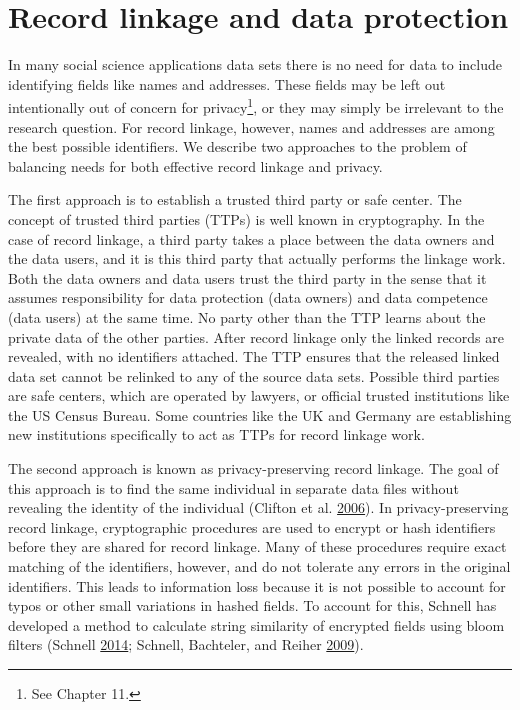 \documentclass[]{krantz}
\begin{document}
\section{Record linkage and data
protection}\label{record-linkage-and-data-protection}

In many social science applications data sets there is no need for data
to include identifying fields like names and addresses. These fields may
be left out intentionally out of concern for privacy\footnote{See
  Chapter 11.}, or they may simply be irrelevant to the research
question. For record linkage, however, names and addresses are among the
best possible identifiers. We describe two approaches to the problem of
balancing needs for both effective record linkage and privacy.

The first approach is to establish a trusted third party or safe center.
The concept of trusted third parties (TTPs) is well known in
cryptography. In the case of record linkage, a third party takes a place
between the data owners and the data users, and it is this third party
that actually performs the linkage work. Both the data owners and data
users trust the third party in the sense that it assumes responsibility
for data protection (data owners) and data competence (data users) at
the same time. No party other than the TTP learns about the private data
of the other parties. After record linkage only the linked records are
revealed, with no identifiers attached. The TTP ensures that the
released linked data set cannot be relinked to any of the source data
sets. Possible third parties are safe centers, which are operated by
lawyers, or official trusted institutions like the US Census Bureau.
Some countries like the UK and Germany are establishing new institutions
specifically to act as TTPs for record linkage work.

The second approach is known as privacy-preserving record linkage. The
goal of this approach is to find the same individual in separate data
files without revealing the identity of the individual (Clifton et al.
\protect\hyperlink{ref-Clifton06}{2006}). In privacy-preserving record
linkage, cryptographic procedures are used to encrypt or hash
identifiers before they are shared for record linkage. Many of these
procedures require exact matching of the identifiers, however, and do
not tolerate any errors in the original identifiers. This leads to
information loss because it is not possible to account for typos or
other small variations in hashed fields. To account for this, Schnell
has developed a method to calculate string similarity of encrypted
fields using bloom filters (Schnell
\protect\hyperlink{ref-schnell2014efficient}{2014}; Schnell, Bachteler,
and Reiher \protect\hyperlink{ref-schnell2009privacy}{2009}).
\end{document}
